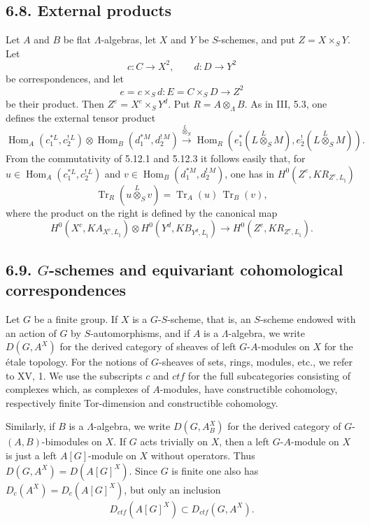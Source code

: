 \documentclass[11pt]{article}
\theoremstyle{plain}
\theoremstyle{definition}
\theoremstyle{remark}
\DeclareMathOperator{\Hom}{Hom}
\DeclareMathOperator{\Tr}{Tr}
\begin{document}
\subsection*{6.8. External products}

Let $A$ and $B$ be flat $\Lambda$-algebras, let $X$ and $Y$ be $S$-schemes, and put
$Z=X\times_S Y$. Let
\[
      c:C\to X^2,\qquad d:D\to Y^2
\]
be correspondences, and let
\[
      e=c\times_S d:E=C\times_S D\to Z^2
\]
be their product. Then $Z^e=X^c\times_S Y^d$. Put $R=A\otimes_\Lambda B$.
As in III, 5.3, one defines the external tensor product
\begin{equation}\tag{6.8.1}
\Hom_A(c_1^{*L},c_2^{!\,L})\otimes
\Hom_B(d_1^{*M},d_2^{!\,M})
\xrightarrow{\overset{L}{\otimes}_S}
\Hom_R(e_1^{*}(L\overset{L}{\otimes}_SM),e_2^{!}(L\overset{L}{\otimes}_SM)).
\end{equation}
From the commutativity of 5.12.1 and 5.12.3 it follows easily that, for
$u\in\Hom_A(c_1^{*L},c_2^{!\,L})$ and
$v\in\Hom_B(d_1^{*M},d_2^{!\,M})$, one has in
$H^0(Z^e,K R_{Z^e,L_\natural})$
\begin{equation}\tag{6.8.2}
      \Tr_R(u\overset{L}{\otimes}_S v)=\Tr_A(u)\,\Tr_B(v),
\end{equation}
where the product on the right is defined by the canonical map
\begin{equation}\tag{6.8.3}
H^0(X^c,K A_{X^c,L_\natural})\otimes
H^0(Y^d,K B_{Y^d,L_\natural})
\longrightarrow
H^0(Z^e,K R_{Z^e,L_\natural}).
\end{equation}

\subsection*{6.9. $G$-schemes and equivariant cohomological correspondences}

Let $G$ be a finite group. If $X$ is a $G$-$S$-scheme, that is, an $S$-scheme endowed
with an action of $G$ by $S$-automorphisms, and if $A$ is a $\Lambda$-algebra, we
write $D(G,A^X)$ for the derived category of sheaves of left $G$-$A$-modules on
$X$ for the étale topology. For the notions of $G$-sheaves of sets, rings, modules,
etc., we refer to XV, 1. We use the subscripts $c$ and $ctf$ for the full
subcategories consisting of complexes which, as complexes of $A$-modules, have
constructible cohomology, respectively finite Tor-dimension and constructible
cohomology.

Similarly, if $B$ is a $\Lambda$-algebra, we write $D(G,A_B^X)$ for the derived
category of $G$-$(A,B)$-bimodules on $X$. If $G$ acts trivially on $X$, then a
left $G$-$A$-module on $X$ is just a left $A[G]$-module on $X$ without operators.
Thus $D(G,A^X)=D(A[G]^X)$. Since $G$ is finite one also has
$D_c(A^X)=D_c(A[G]^X)$, but only an inclusion
\[
     D_{ctf}(A[G]^X)\subset D_{ctf}(G,A^X).
\]
\end{document}
